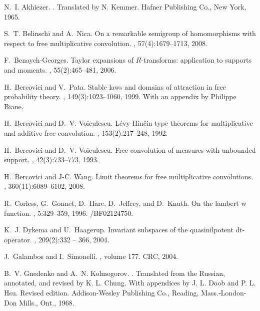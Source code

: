 \documentclass[12pt]{amsart}
\theoremstyle{definition}
\numberwithin{equation}{section}
\begin{document}
\begin{thebibliography}{HD}

\normalsize
\baselineskip=17pt

N.~I. Akhiezer.
.
\newblock Translated by N. Kemmer. Hafner Publishing Co., New York, 1965.

S.~T. Belinschi and A.~Nica.
\newblock On a remarkable semigroup of homomorphisms with respect to free
  multiplicative convolution.
, 57(4):1679--1713, 2008.

F.~Benaych-Georges.
\newblock Taylor expansions of {$R$}-transforms: application to supports and
  moments.
, 55(2):465--481, 2006.

H.~Bercovici and V.~Pata.
\newblock Stable laws and domains of attraction in free probability theory.
, 149(3):1023--1060, 1999.
\newblock With an appendix by Philippe Biane.

H.~Bercovici and D.~V. Voiculescu.
\newblock L\'evy-{H}in\v cin type theorems for multiplicative and additive free
  convolution.
, 153(2):217--248, 1992.

H.~Bercovici and D.~V. Voiculescu.
\newblock Free convolution of measures with unbounded support.
, 42(3):733--773, 1993.

H.~Bercovici and J-C. Wang.
\newblock Limit theorems for free multiplicative convolutions.
, 360(11):6089--6102, 2008.

R.~Corless, G.~Gonnet, D.~Hare, D.~Jeffrey, and D.~Knuth.
\newblock On the lambert w function.
, 5:329--359, 1996.
/BF02124750.

K.~J. Dykema and U.~Haagerup.
\newblock Invariant subspaces of the quasinilpotent dt-operator.
, 209(2):332 -- 366, 2004.

J.~Galambos and I.~Simonelli.
, volume 177.
\newblock CRC, 2004.

B.~V. Gnedenko and A.~N. Kolmogorov.
.
\newblock Translated from the Russian, annotated, and revised by K. L. Chung.
  With appendices by J. L. Doob and P. L. Hsu. Revised edition. Addison-Wesley
  Publishing Co., Reading, Mass.-London-Don Mills., Ont., 1968.


\end{thebibliography}
\end{document}
